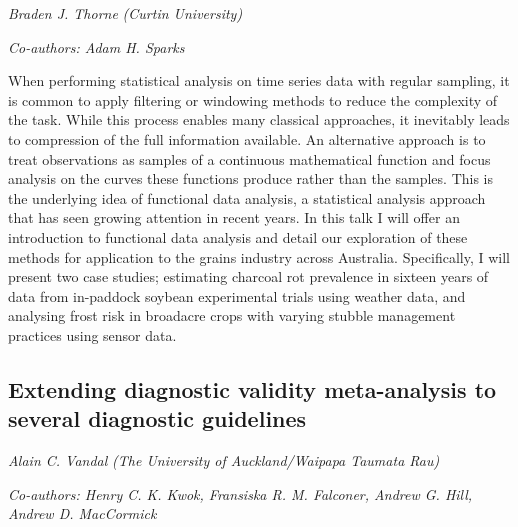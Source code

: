 \documentclass[
]{scrreprt}
\begin{document}
\emph{Braden J. Thorne} \emph{(Curtin
University)}

\emph{Co-authors: Adam H. Sparks}

\setlength{\parskip}{0.5em}

When performing statistical analysis on time series data with regular
sampling, it is common to apply filtering or windowing methods to reduce
the complexity of the task. While this process enables many classical
approaches, it inevitably leads to compression of the full information
available. An alternative approach is to treat observations as samples
of a continuous mathematical function and focus analysis on the curves
these functions produce rather than the samples. This is the underlying
idea of functional data analysis, a statistical analysis approach that
has seen growing attention in recent years. In this talk I will offer an
introduction to functional data analysis and detail our exploration of
these methods for application to the grains industry across Australia.
Specifically, I will present two case studies; estimating charcoal rot
prevalence in sixteen years of data from in-paddock soybean experimental
trials using weather data, and analysing frost risk in broadacre crops
with varying stubble management practices using sensor data.

\subsection{Extending diagnostic validity meta-analysis to several
diagnostic
guidelines}\label{extending-diagnostic-validity-meta-analysis-to-several-diagnostic-guidelines}

\emph{Alain C. Vandal} \emph{(The University of
Auckland/Waipapa Taumata Rau)}

\emph{Co-authors: Henry C. K. Kwok, Fransiska R. M. Falconer, Andrew G.
Hill, Andrew D. MacCormick}

\setlength{\parskip}{0.5em}
\end{document}
